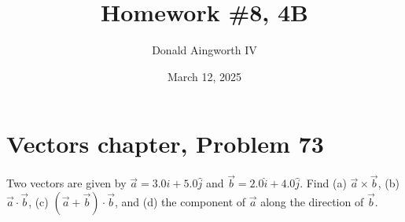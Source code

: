 \documentclass[12pt]{article}
\title{Homework \#8, 4B}
\author{Donald Aingworth IV}
\date{March 12, 2025}
\begin{document}

\maketitle

\pagebreak
\section{Vectors chapter, Problem 73}
Two vectors are given by $\vec{a} = 3.0\hat{i} + 5.0\hat{j}$ and $\vec{b} = 2.0\hat{i} + 4.0\hat{j}$. Find (a) $\vec{a} \times \vec{b}$, (b) $\vec{a} \cdot \vec{b}$, (c) $\left(\vec{a} + \vec{b}\right) \cdot \vec{b}$, and (d) the component of $\vec{a}$ along the direction of $\vec{b}$.
\end{document}
